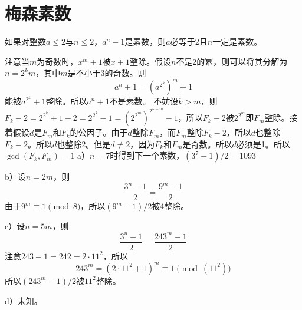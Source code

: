 \chapter{梅森素数}
\begin{statement}
如果对整数$a\le 2$与$n\le2$，$a^n-1$是素数，则$a$必等于2且$n$一定是素数。
\end{statement}
%
\exercise 注意当$m$为奇数时，$x^m+1$被$x+1$整除。假设$n$不是2的幂，则可以将其分解为$n=2^km$，其中$m$是不小于3的奇数。则
\[a^n+1=\left(a^{2^k}\right)^m+1\]
能被$a^{2^k}+1$整除。所以$a^n+1$不是素数。
%
\exercise 不妨设$k>m$，则$F_k-2=2^{2^k}+1-2=2^{2^k}-1=(2^{2^m})^{2^{k-m}}-1$，所以$F_k-2$被$2^{2^m}$即$F_m$整除。接着假设$d$是$F_m$和$F_k$的公因子。由于$d$整除$F_m$，而$F_m$整除$F_k-2$，所以$d$也整除$F_k-2$。所以$d$也整除2。但是$d\not=2$，因为$F_k$和$F_m$是奇数。所以$d$必须是1。所以$\gcd(F_k,F_m)=1$
%
\exercise a）$n=7$时得到下一个素数，$(3^7-1)/2=1093$\par
b）设$n=2m$，则
\[\frac{3^n-1}{2}=\frac{9^m-1}{2}\]
由于$9^m\equiv1\pmod8$，所以$(9^m-1)/2$被4整除。\par
c）设$n=5m$，则
\[\frac{3^n-1}{2}=\frac{243^m-1}{2}\]
注意$243-1=242=2\cdot11^2$，所以
\[243^m=(2\cdot11^2+1)^m\equiv1\pmod(11^2)\]
所以$(243^m-1)/2$被$11^2$整除。\par
d）未知。
